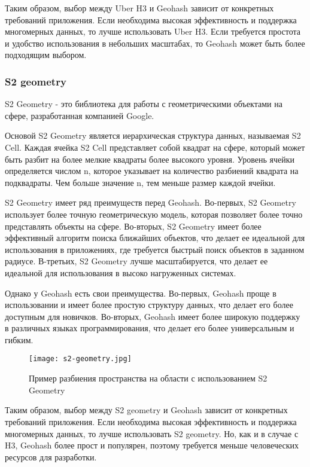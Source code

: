 Таким образом, выбор между Uber H3 и Geohash зависит от конкретных требований приложения. Если необходима высокая эффективность и поддержка многомерных данных, то лучше использовать Uber H3. Если требуется простота и удобство использования в небольших масштабах, то Geohash может быть более подходящим выбором.

\subsubsection{S2 geometry}

S2 Geometry - это библиотека для работы с геометрическими объектами на сфере, разработанная компанией Google.

Основой S2 Geometry является иерархическая структура данных, называемая S2 Cell. Каждая ячейка S2 Cell представляет собой квадрат на сфере, который может быть разбит на более мелкие квадраты более высокого уровня. Уровень ячейки определяется числом n, которое указывает на количество разбиений квадрата на подквадраты. Чем больше значение n, тем меньше размер каждой ячейки.

S2 Geometry имеет ряд преимуществ перед Geohash. Во-первых, S2 Geometry использует более точную геометрическую модель, которая позволяет более точно представлять объекты на сфере. Во-вторых, S2 Geometry имеет более эффективный алгоритм поиска ближайших объектов, что делает ее идеальной для использования в приложениях, где требуется быстрый поиск объектов в заданном радиусе. В-третьих, S2 Geometry лучше масштабируется, что делает ее идеальной для использования в высоко нагруженных системах.

Однако у Geohash есть свои преимущества. Во-первых, Geohash проще в использовании и имеет более простую структуру данных, что делает его более доступным для новичков. Во-вторых, Geohash имеет более широкую поддержку в различных языках программирования, что делает его более универсальным и гибким.


\begin{figure}[h]
    \centering
    \texttt{[image: s2-geometry.jpg]}
    \caption{Пример разбиения пространства на области с использованием S2 Geometry}
\end{figure}

Таким образом, выбор между S2 geometry и Geohash зависит от конкретных требований приложения. Если необходима высокая эффективность и поддержка многомерных данных, то лучше использовать S2 geometry. Но, как и в случае с H3, Geohash более прост и популярен, поэтому требуется меньше человеческих ресурсов для разработки.
